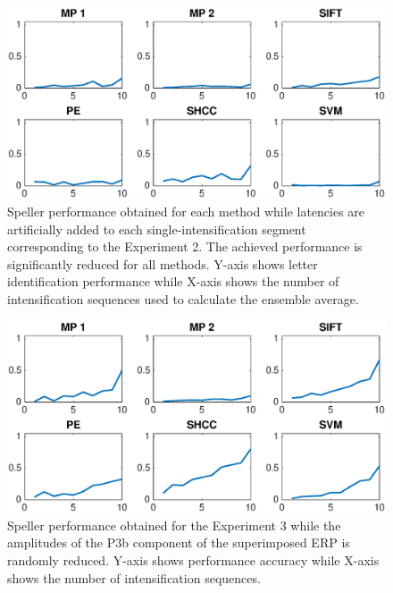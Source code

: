 \begin{figure}[h!]
\centering
\includegraphics[width=15cm]{images/CrossPerformanceTestLatency.eps}
\caption[Experiment II Pseudo-real Dataset Speller Performance]{Speller performance obtained for each method while latencies are artificially added to each single-intensification segment corresponding to the Experiment 2.  The achieved performance is significantly reduced for all methods. Y-axis shows letter identification performance while X-axis shows the number of intensification sequences used to calculate the ensemble average.}
\label{fig:performancetestlatency}
\end{figure}


\begin{figure}[h!]
\centering
\includegraphics[width=15cm]{images/CrossPerformanceTestAmplitude.eps}
\caption[Experiment III Pseudo-real Dataset Speller Performance]{Speller performance obtained for the Experiment 3 while the amplitudes of the P3b component of the superimposed ERP is randomly reduced. Y-axis shows performance accuracy while X-axis shows the number of intensification sequences.}
\label{fig:performancetestamplitude}
\end{figure}

